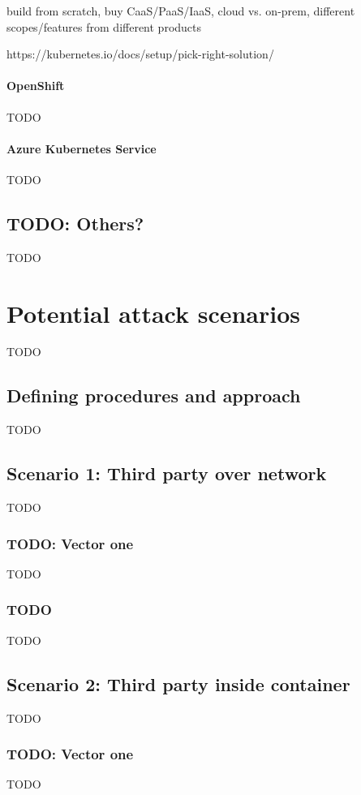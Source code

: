 build from scratch, buy CaaS/PaaS/IaaS, cloud vs. on-prem, different scopes/features from different products

https://kubernetes.io/docs/setup/pick-right-solution/

\subsubsection{OpenShift}
TODO

\subsubsection{Azure Kubernetes Service}
TODO

\section{TODO: Others?}
TODO

\chapter{Potential attack scenarios}
TODO

\section{Defining procedures and approach}
TODO

\section{Scenario 1: Third party over network}
TODO

\subsection{TODO: Vector one}
TODO

\subsection{TODO}
TODO

\section{Scenario 2: Third party inside container}
TODO

\subsection{TODO: Vector one}
TODO

